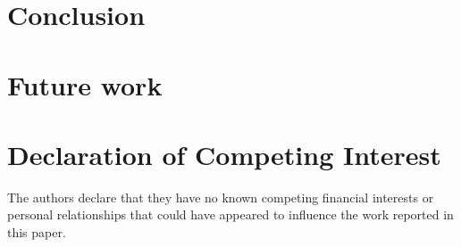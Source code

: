 \section{Conclusion} \label{Conclusion}

\section{Future work}


\section{Declaration of Competing Interest}

The authors declare that they have no known competing financial interests or personal relationships that could have appeared to influence the work reported in this paper.
